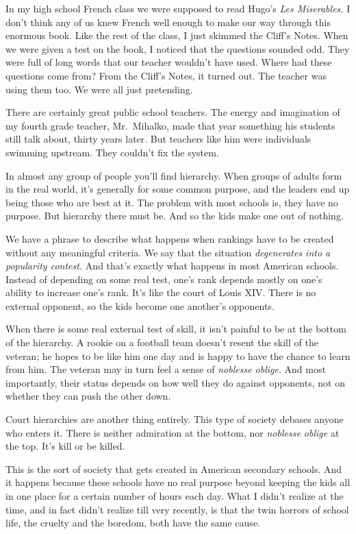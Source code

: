 In my high school French class we were supposed to read Hugo's \emph{Les
Miserables.} I don't think any of us knew French well enough to make our
way through this enormous book. Like the rest of the class, I just
skimmed the Cliff's Notes. When we were given a test on the book, I
noticed that the questions sounded odd. They were full of long words
that our teacher wouldn't have used. Where had these questions come
from? From the Cliff's Notes, it turned out. The teacher was using them
too. We were all just pretending.

There are certainly great public school teachers. The energy and
imagination of my fourth grade teacher, Mr.~Mihalko, made that year
something his students still talk about, thirty years later. But
teachers like him were individuals swimming upstream. They couldn't fix
the system.

In almost any group of people you'll find hierarchy. When groups of
adults form in the real world, it's generally for some common purpose,
and the leaders end up being those who are best at it. The problem with
most schools is, they have no purpose. But hierarchy there must be. And
so the kids make one out of nothing.

We have a phrase to describe what happens when rankings have to be
created without any meaningful criteria. We say that the situation
\emph{degenerates into a popularity contest.} And that's exactly what
happens in most American schools. Instead of depending on some real
test, one's rank depends mostly on one's ability to increase one's rank.
It's like the court of Louis XIV. There is no external opponent, so the
kids become one another's opponents.

When there is some real external test of skill, it isn't painful to be
at the bottom of the hierarchy. A rookie on a football team doesn't
resent the skill of the veteran; he hopes to be like him one day and is
happy to have the chance to learn from him. The veteran may in turn feel
a sense of \emph{noblesse oblige}. And most importantly, their status
depends on how well they do against opponents, not on whether they can
push the other down.

Court hierarchies are another thing entirely. This type of society
debases anyone who enters it. There is neither admiration at the bottom,
nor \emph{noblesse oblige} at the top. It's kill or be killed.

This is the sort of society that gets created in American secondary
schools. And it happens because these schools have no real purpose
beyond keeping the kids all in one place for a certain number of hours
each day. What I didn't realize at the time, and in fact didn't realize
till very recently, is that the twin horrors of school life, the cruelty
and the boredom, both have the same cause.

